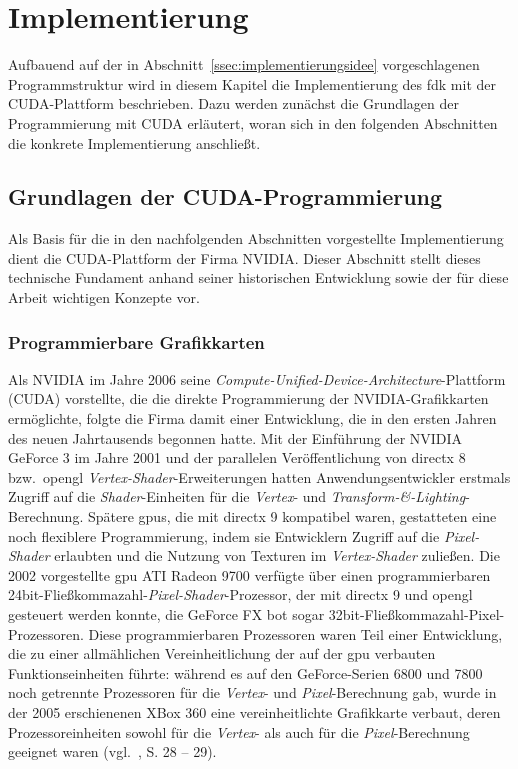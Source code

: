 \chapter{Implementierung}\label{chap:implementierung}

Aufbauend auf der in Abschnitt~\ref{ssec:implementierungsidee} vorgeschlagenen Programmstruktur wird in diesem Kapitel
die Implementierung des \gls{fdk} mit der CUDA-Plattform beschrieben. Dazu werden zunächst die Grundlagen der
Programmierung mit CUDA erläutert, woran sich in den folgenden Abschnitten die konkrete Implementierung anschließt.

\section{Grundlagen der CUDA-Programmierung}\label{sec:grundlagen_cuda}

Als Basis für die in den nachfolgenden Abschnitten vorgestellte Implementierung dient die CUDA-Plattform der Firma
NVIDIA\@. Dieser Abschnitt stellt dieses technische Fundament anhand seiner historischen Entwicklung sowie der für diese
Arbeit wichtigen Konzepte vor.

\subsection{Programmierbare Grafikkarten}\label{ssec:cu_prog_gpu}

Als NVIDIA im Jahre 2006 seine \textit{Compute-Unified-Device-Architecture}-Plattform (CUDA) vorstellte, die die
direkte Programmierung der NVIDIA-Grafikkarten ermöglichte, folgte die Firma damit einer Entwicklung, die in den ersten
Jahren des neuen Jahrtausends begonnen hatte. Mit der Einführung der NVIDIA GeForce 3 im Jahre 2001 und der parallelen
Veröffentlichung von \gls{directx} 8 bzw.\ \gls{opengl} \textit{Vertex-Shader}-Erweiterungen hatten Anwendungsentwickler
erstmals Zugriff auf die \textit{Shader}-Einheiten für die \textit{Vertex}- und
\textit{Transform-\&-Lighting}-Berechnung. Spätere \gls{gpu}s, die mit \gls{directx} 9 kompatibel waren, gestatteten
eine noch flexiblere Programmierung, indem sie Entwicklern Zugriff auf die \textit{Pixel-Shader} erlaubten und die
Nutzung von Texturen im \textit{Vertex-Shader} zuließen. Die 2002 vorgestellte \gls{gpu} ATI Radeon 9700 verfügte über
einen programmierbaren 24bit-Fließkommazahl-\textit{Pixel-Shader}-Prozessor, der mit \gls{directx} 9 und \gls{opengl}
gesteuert werden konnte, die GeForce FX bot sogar 32bit-Fließkommazahl-Pixel-Prozessoren. Diese programmierbaren
Prozessoren waren Teil einer Entwicklung, die zu einer allmählichen Vereinheitlichung der auf der \gls{gpu} verbauten
Funktionseinheiten führte: während es auf den GeForce-Serien 6800 und 7800 noch getrennte Prozessoren für die
\textit{Vertex}- und \textit{Pixel}-Berechnung gab, wurde in der 2005 erschienenen XBox 360 eine
{\glqq}vereinheitlichte{\grqq} Grafikkarte verbaut, deren Prozessoreinheiten sowohl für die \textit{Vertex}- als auch
für die \textit{Pixel}-Berechnung geeignet waren (vgl.~\cite{kirkhwu}, S. 28 -- 29).

